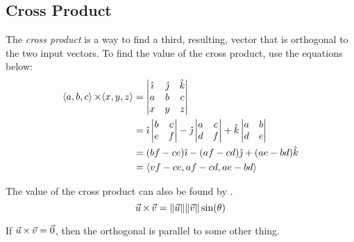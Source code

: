 \subsection{Cross Product}\label{subsec:Cross_Product}
\begin{definition}\label{def:Cross_Product}
  The \emph{cross product} is a way to find a third, resulting, vector that is orthogonal to the two input vectors.
  To find the value of the cross product, use the equations below:
  \begin{equation}\label{eq:Cross_Product}
    \begin{aligned}
      \langle a, b, c \rangle \operatorname{\times} \langle x, y, z \rangle &=
      \begin{vmatrix}
        \hat{\imath} & \hat{\jmath} & \hat{k} \\
        a & b & c \\
        x & y & z
      \end{vmatrix} \\
      &=
      \hat{\imath} \begin{vmatrix}
        b & c \\
        e & f
      \end{vmatrix} -
      \hat{\jmath} \begin{vmatrix}
        a & c \\
        d & f
      \end{vmatrix} +
      \hat{k} \begin{vmatrix}
        a & b \\
        d & e
      \end{vmatrix} \\
      &= (bf - ce)\hat{\imath} - (af-cd)\hat{\jmath} + (ae-bd)\hat{k} \\
      &= \langle vf-ce, af-cd, ae-bd \rangle \\
    \end{aligned}
  \end{equation}

  The value of the cross product can also be found by .
  \begin{equation}\label{eq:Cross_Product_Magnitude}
    \vec{u} \operatorname{\times} \vec{v} = \lVert \vec{u} \rVert \lVert \vec{v} \rVert \sin(\theta)
  \end{equation}

  \begin{remark}\label{rmk:Cross_Product_Orthogonality}
    If $\vec{u} \operatorname{\times} \vec{v} = \vec{0}$, then the orthogonal  is parallel to some other thing.
  \end{remark}
\end{definition}


